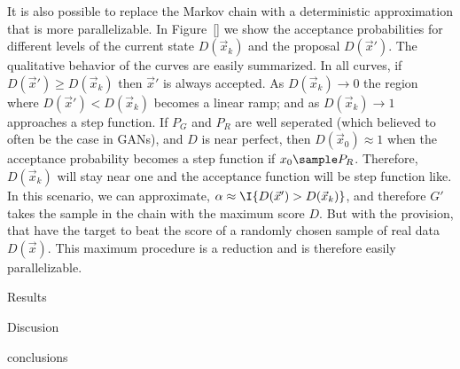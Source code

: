It is also possible to replace the Markov chain with a deterministic approximation that is more parallelizable.
In Figure~\ref{} we show the acceptance probabilities for different levels of the current state $D(\vec x_k)$ and the proposal $D(\vec x')$.
The qualitative behavior of the curves are easily summarized.
In all curves, if $D(\vec x') \geq D(\vec x_k)$ then $\vec x'$ is always accepted.
As $D(\vec x_k) \rightarrow 0$ the region where $D(\vec x') < D(\vec x_k)$ becomes a linear ramp; and as $D(\vec x_k) \rightarrow 1$ approaches a step function.
If $P_G$ and $P_R$ are well seperated (which believed to often be the case in GANs), and $D$ is near perfect, then $D(\vec x_0) \approx 1$ when the acceptance probability becomes a step function if $x_0 \sample P_R$.
Therefore, $D(\vec x_k)$ will stay near one and the acceptance function will be step function like.
In this scenario, we can approximate, $\alpha \approx \I{D(\vec x') > D(\vec x_k)}$, and therefore $G'$ takes the sample in the chain with the maximum score $D$.
But with the provision, that have the target to beat the score of a randomly chosen sample of real data $D(\vec x)$.
This maximum procedure is a reduction and is therefore easily parallelizable.


Results








Discusion






conclusions




